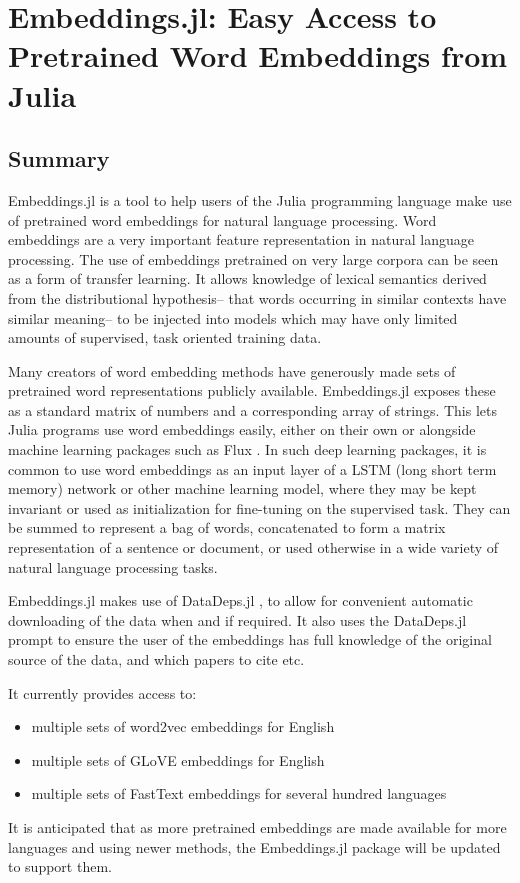 \documentclass{book}
\begin{document}
\chapter{Embeddings.jl: Easy Access to Pretrained Word Embeddings from Julia}

\hypertarget{summary}{%
\section{Summary}}
Embeddings.jl is a tool to help users of the Julia programming language
\citep{Julia} make use of pretrained word embeddings for natural language
processing. Word embeddings are a very important feature representation
in natural language processing. The use of embeddings pretrained on very
large corpora can be seen as a form of transfer learning. It allows
knowledge of lexical semantics derived from the distributional
hypothesis-- that words occurring in similar contexts have similar
meaning-- to be injected into models which may have only limited amounts
of supervised, task oriented training data.

Many creators of word embedding methods have generously made sets of
pretrained word representations publicly available. Embeddings.jl
exposes these as a standard matrix of numbers and a corresponding array
of strings. This lets Julia programs use word embeddings easily, either
on their own or alongside machine learning packages such as Flux
\citep{flux}. In such deep learning packages, it is common to use word
embeddings as an input layer of a LSTM (long short term memory) network
or other machine learning model, where they may be kept invariant or
used as initialization for fine-tuning on the supervised task. They can
be summed to represent a bag of words, concatenated to form a matrix
representation of a sentence or document, or used otherwise in a wide
variety of natural language processing tasks.

Embeddings.jl makes use of DataDeps.jl  \citep{2018arXiv180801091W}, to allow for
convenient automatic downloading of the data when and if required. It
also uses the DataDeps.jl prompt to ensure the user of the embeddings
has full knowledge of the original source of the data, and which papers
to cite etc.

It currently provides access to:

\begin{itemize}
	\item
	multiple sets of word2vec embeddings \citep{mikolov2013efficient} for English
	\item
	multiple sets of GLoVE embeddings \citep{pennington2014glove} for English
	\item
	multiple sets of FastText embeddings \citep{bojanowski2016enriching,fasttext157lang}
	for several hundred languages
\end{itemize}

It is anticipated that as more pretrained embeddings are made available
for more languages and using newer methods, the Embeddings.jl package
will be updated to support them.
\end{document}
